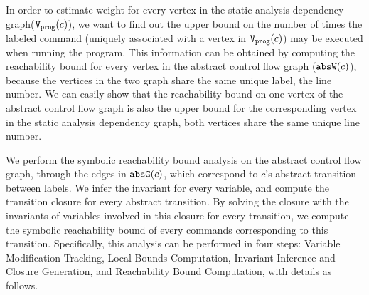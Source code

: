 {In order to estimate weight for every vertex in the static analysis dependency graph($\mathtt{{V_{prog}}}(c)$), we want to find out the upper bound on 
the number of times the labeled command (uniquely associated with a vertex in $\mathtt{{V_{prog}}}(c)$) may be executed when running the program.
This information can be obtained by computing the reachability bound for every vertex in the abstract control flow graph ($\mathtt{abs}{\mathtt{W}}(c)$), because
the vertices in the two graph share the same unique label, the line number. We can easily show that the reachability bound on one vertex of the abstract control flow graph is also the upper bound for the corresponding vertex in the static analysis dependency graph, both vertices share the same unique line number.}


We perform the symbolic reachability bound analysis on the abstract control flow graph, 
through the edges in $\mathtt{abs}{\mathtt{G}}(c)$, which correspond to $c$'s abstract transition between labels.
We infer the invariant for every variable, and compute the transition closure for every abstract transition. By solving the closure
with the invariants of variables involved in this closure for every transition, we compute
the symbolic reachability bound of every commands corresponding to this transition. Specifically, this analysis can be performed in four steps:
 Variable Modification Tracking, Local Bounds Computation,
Invariant Inference and Closure Generation, and Reachability Bound Computation,
% 
with details as follows.
%
%
